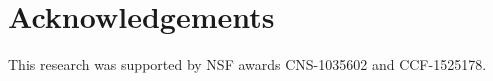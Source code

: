 \documentclass[times]{stvrauth}
\newcommand\BibTeX{{\rmfamily B\kern-.05em \textsc{i\kern-.025em b}\kern-.08em
T\kern-.1667em\lower.7ex\hbox{E}\kern-.125emX}}
\def\volumeyear{2010}
\begin{document}
\section{Acknowledgements}
This research was supported by NSF awards CNS-1035602 and CCF-1525178.
%
%
%
%
%
%
%
\end{document}
